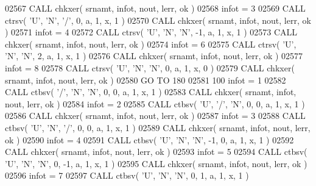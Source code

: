 \begin{DoxyCode}
02567       \textcolor{keyword}{CALL }chkxer( srnamt, infot, nout, lerr, ok )
02568       infot = 3
02569       \textcolor{keyword}{CALL }ctrsv( \textcolor{stringliteral}{'U'}, \textcolor{stringliteral}{'N'}, \textcolor{stringliteral}{'/'}, 0, a, 1, x, 1 )
02570       \textcolor{keyword}{CALL }chkxer( srnamt, infot, nout, lerr, ok )
02571       infot = 4
02572       \textcolor{keyword}{CALL }ctrsv( \textcolor{stringliteral}{'U'}, \textcolor{stringliteral}{'N'}, \textcolor{stringliteral}{'N'}, -1, a, 1, x, 1 )
02573       \textcolor{keyword}{CALL }chkxer( srnamt, infot, nout, lerr, ok )
02574       infot = 6
02575       \textcolor{keyword}{CALL }ctrsv( \textcolor{stringliteral}{'U'}, \textcolor{stringliteral}{'N'}, \textcolor{stringliteral}{'N'}, 2, a, 1, x, 1 )
02576       \textcolor{keyword}{CALL }chkxer( srnamt, infot, nout, lerr, ok )
02577       infot = 8
02578       \textcolor{keyword}{CALL }ctrsv( \textcolor{stringliteral}{'U'}, \textcolor{stringliteral}{'N'}, \textcolor{stringliteral}{'N'}, 0, a, 1, x, 0 )
02579       \textcolor{keyword}{CALL }chkxer( srnamt, infot, nout, lerr, ok )
02580       \textcolor{keywordflow}{GO TO} 180
02581   100 infot = 1
02582       \textcolor{keyword}{CALL }ctbsv( \textcolor{stringliteral}{'/'}, \textcolor{stringliteral}{'N'}, \textcolor{stringliteral}{'N'}, 0, 0, a, 1, x, 1 )
02583       \textcolor{keyword}{CALL }chkxer( srnamt, infot, nout, lerr, ok )
02584       infot = 2
02585       \textcolor{keyword}{CALL }ctbsv( \textcolor{stringliteral}{'U'}, \textcolor{stringliteral}{'/'}, \textcolor{stringliteral}{'N'}, 0, 0, a, 1, x, 1 )
02586       \textcolor{keyword}{CALL }chkxer( srnamt, infot, nout, lerr, ok )
02587       infot = 3
02588       \textcolor{keyword}{CALL }ctbsv( \textcolor{stringliteral}{'U'}, \textcolor{stringliteral}{'N'}, \textcolor{stringliteral}{'/'}, 0, 0, a, 1, x, 1 )
02589       \textcolor{keyword}{CALL }chkxer( srnamt, infot, nout, lerr, ok )
02590       infot = 4
02591       \textcolor{keyword}{CALL }ctbsv( \textcolor{stringliteral}{'U'}, \textcolor{stringliteral}{'N'}, \textcolor{stringliteral}{'N'}, -1, 0, a, 1, x, 1 )
02592       \textcolor{keyword}{CALL }chkxer( srnamt, infot, nout, lerr, ok )
02593       infot = 5
02594       \textcolor{keyword}{CALL }ctbsv( \textcolor{stringliteral}{'U'}, \textcolor{stringliteral}{'N'}, \textcolor{stringliteral}{'N'}, 0, -1, a, 1, x, 1 )
02595       \textcolor{keyword}{CALL }chkxer( srnamt, infot, nout, lerr, ok )
02596       infot = 7
02597       \textcolor{keyword}{CALL }ctbsv( \textcolor{stringliteral}{'U'}, \textcolor{stringliteral}{'N'}, \textcolor{stringliteral}{'N'}, 0, 1, a, 1, x, 1 )

\end{DoxyCode}
